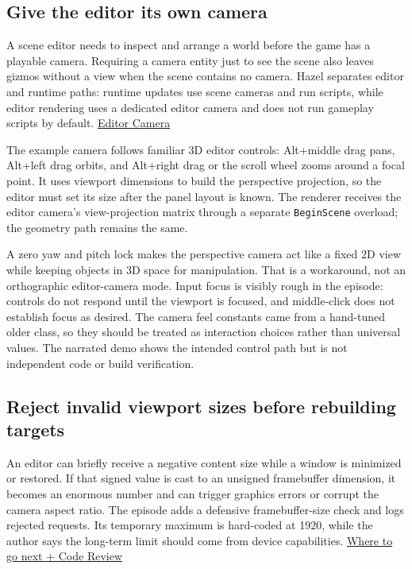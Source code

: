\subsection{Give the editor its own camera}\label{06-engine-ii-ch032-give-the-editor-its-own-camera}

\hypertarget{06-engine-ii-ch032-give-the-editor-its-own-camera}{}

A scene editor needs to inspect and arrange a world before the game has a playable camera. Requiring a camera entity just to see the scene also leaves gizmos without a view when the scene contains no camera. Hazel separates editor and runtime paths: runtime updates use scene cameras and run scripts, while editor rendering uses a dedicated editor camera and does not run gameplay scripts by default. \href{https://www.youtube.com/watch?v=8zVtRpBTwe0}{Editor Camera}

The example camera follows familiar 3D editor controls: Alt+middle drag pans, Alt+left drag orbits, and Alt+right drag or the scroll wheel zooms around a focal point. It uses viewport dimensions to build the perspective projection, so the editor must set its size after the panel layout is known. The renderer receives the editor camera's view-projection matrix through a separate \texttt{BeginScene} overload; the geometry path remains the same.

A zero yaw and pitch lock makes the perspective camera act like a fixed 2D view while keeping objects in 3D space for manipulation. That is a workaround, not an orthographic editor-camera mode. Input focus is visibly rough in the episode: controls do not respond until the viewport is focused, and middle-click does not establish focus as desired. The camera feel constants came from a hand-tuned older class, so they should be treated as interaction choices rather than universal values. The narrated demo shows the intended control path but is not independent code or build verification.

\subsection{Reject invalid viewport sizes before rebuilding targets}\label{06-engine-ii-ch032-reject-invalid-viewport-sizes-before-rebuilding-targets}

\hypertarget{06-engine-ii-ch032-reject-invalid-viewport-sizes-before-rebuilding-targets}{}

An editor can briefly receive a negative content size while a window is minimized or restored. If that signed value is cast to an unsigned framebuffer dimension, it becomes an enormous number and can trigger graphics errors or corrupt the camera aspect ratio. The episode adds a defensive framebuffer-size check and logs rejected requests. Its temporary maximum is hard-coded at 1920, while the author says the long-term limit should come from device capabilities. \href{https://www.youtube.com/watch?v=ZVy81M-IST0}{Where to go next + Code Review}

